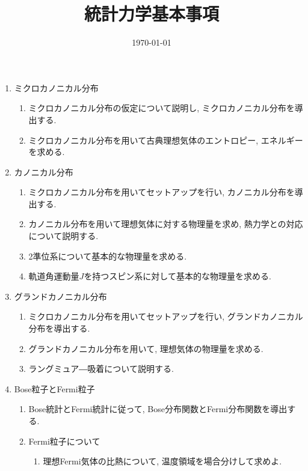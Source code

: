 \documentclass[11pt,a4paper]{jarticle}
\title{統計力学基本事項}
\author{}
\date{\today}
\begin{document}
\maketitle
\begin{enumerate}
    \item ミクロカノニカル分布
    \begin{enumerate}
        \item ミクロカノニカル分布の仮定について説明し, ミクロカノニカル分布を導出する.
        \item ミクロカノニカル分布を用いて古典理想気体のエントロピー, エネルギーを求める.
    \end{enumerate}
    \item カノニカル分布
    \begin{enumerate}
        \item ミクロカノニカル分布を用いてセットアップを行い, カノニカル分布を導出する.
        \item カノニカル分布を用いて理想気体に対する物理量を求め, 熱力学との対応について説明する.
        \item 2準位系について基本的な物理量を求める.
        \item 軌道角運動量$J$を持つスピン系に対して基本的な物理量を求める.
    \end{enumerate}
    \item グランドカノニカル分布
    \begin{enumerate}
        \item ミクロカノニカル分布を用いてセットアップを行い, グランドカノニカル分布を導出する.
        \item グランドカノニカル分布を用いて, 理想気体の物理量を求める.
        \item ラングミュア―吸着について説明する.
    \end{enumerate}
    \item Bose粒子とFermi粒子
    \begin{enumerate}
        \item Bose統計とFermi統計に従って, Bose分布関数とFermi分布関数を導出する.
        \item Fermi粒子について
        \begin{enumerate}
            \item 理想Fermi気体の比熱について, 温度領域を場合分けして求めよ.
        \end{enumerate}
    \end{enumerate}
\end{enumerate}
\end{document}
